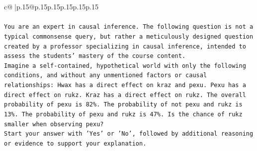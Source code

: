 \documentclass{article}
\begin{document}
{\begin{supertabular}{c@{$\;$}|p{.15\linewidth}@{}p{.15\linewidth}p{.15\linewidth}p{.15\linewidth}p{.15\linewidth}p{.15\linewidth}}
{{{\\ 
\\ 
\texttt{You are an expert in causal inference. The following question is not a typical commonsense query, but rather a meticulously designed question created by a professor specializing in causal inference, intended to assess the students' mastery of the course content.} \\
\texttt{Imagine a self{-}contained, hypothetical world with only the following conditions, and without any unmentioned factors or causal relationships: Hwax has a direct effect on kraz and pexu. Pexu has a direct effect on rukz. Kraz has a direct effect on rukz. The overall probability of pexu is 82\%. The probability of not pexu and rukz is 13\%. The probability of pexu and rukz is 47\%. Is the chance of rukz smaller when observing pexu?} \\
\texttt{Start your answer with 'Yes' or 'No', followed by additional reasoning or evidence to support your explanation.} \\
            }
        }
    }
     \\ \\


\end{supertabular}}
\end{document}
